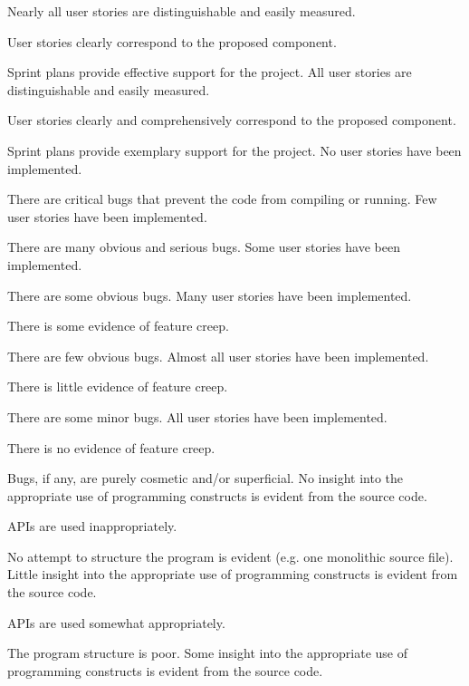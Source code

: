 \documentclass{../fal_assignment}
\begin{document}
\begin{markingrubric}
        \grade Nearly all user stories are distinguishable and easily measured.
            \par User stories clearly correspond to the proposed component.
            \par Sprint plans provide effective support for the project.
        \grade All user stories are distinguishable and easily measured.
            \par User stories clearly and comprehensively correspond to the proposed component.
            \par Sprint plans provide exemplary support for the project.
%
        \grade\fail No user stories have been implemented.
            \par There are critical bugs that prevent the code from compiling or running.
        \grade Few user stories have been implemented.
            \par There are many obvious and serious bugs.
        \grade Some user stories have been implemented.
            \par There are some obvious bugs.
        \grade Many user stories have been implemented.
            \par There is some evidence of feature creep.
            \par There are few obvious bugs.
        \grade Almost all user stories have been implemented.
            \par There is little evidence of feature creep.
            \par There are some minor bugs.
        \grade All user stories have been implemented.
            \par There is no evidence of feature creep.
            \par Bugs, if any, are purely cosmetic and/or superficial.
%
        \grade\fail No insight into the appropriate use of programming constructs is evident from the source code.
            \par APIs are used inappropriately.
            \par No attempt to structure the program is evident (e.g. one monolithic source file).
        \grade Little insight into the appropriate use of programming constructs is evident from the source code.
            \par APIs are used somewhat appropriately.
            \par The program structure is poor.
        \grade Some insight into the appropriate use of programming constructs is evident from the source code.

\end{markingrubric}
\end{document}
